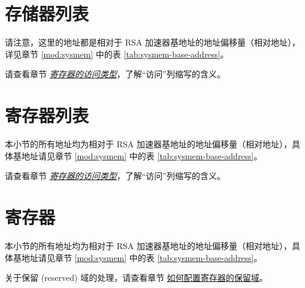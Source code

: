 \documentclass[main\_\_CN.tex]{subfiles}
\begin{document}
\section{存储器列表 }\label{sec:mem-sum}
请注意，这里的地址都是相对于 RSA 加速器基地址的地址偏移量（相对地址），详见章节 \ref{mod:sysmem} \textit{} 中的表 \ref{tab:sysmem-base-address}。

请查看章节 \hyperref[glossary-access-types]{\textit{寄存器的访问类型}}，了解“访问”列缩写的含义。




\hypertarget{rsa-reg-summ}{}
\section{寄存器列表}
\label{sec:rsa-reg-summ}
本小节的所有地址均为相对于 RSA 加速器基地址的地址偏移量（相对地址），具体基地址请见章节 \ref{mod:sysmem} \textit{} 中的表 \ref{tab:sysmem-base-address}。

请查看章节 \hyperref[glossary-access-types]{\textit{寄存器的访问类型}}，了解“访问”列缩写的含义。





\clearpage
\section{寄存器}

本小节的所有地址均为相对于 RSA 加速器基地址的地址偏移量（相对地址），具体基地址请见章节 \ref{mod:sysmem} \textit{} 中的表 \ref{tab:sysmem-base-address}。

关于保留 (reserved) 域的处理，请查看章节 \hyperref[programming-reserved-field]{如何配置寄存器的保留域}。


\end{document}
